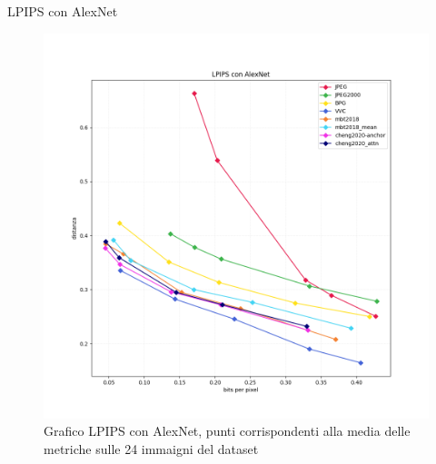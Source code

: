     \begin{frame}{LPIPS con AlexNet}
        \begin{figure}[t!]
            \centering
            \includegraphics[width=0.65\textheight]{Immagini/METRICS/LPIPS.png}
            \caption{Grafico LPIPS \cite{zhang2018unreasonable} con AlexNet, punti corrispondenti alla media delle metriche sulle 24 immaigni del dataset}
            \label{fig:GraphLPIPS}
        \end{figure}
    \end{frame}
    
    